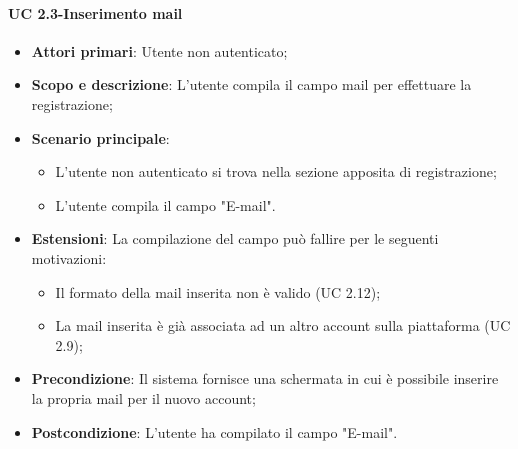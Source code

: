                 
                \paragraph{UC 2.3-Inserimento mail}
                \begin{itemize}
                \item \textbf{Attori primari}: Utente non autenticato;
                
                \item \textbf{Scopo e descrizione}: L'utente compila il campo mail per effettuare la registrazione; 
                \item \textbf{Scenario principale}: 
                    \begin{itemize}
                        \item L'utente non autenticato si trova nella sezione apposita di registrazione;
                        \item L'utente compila il campo "E-mail".
                    \end{itemize}
                \item \textbf{Estensioni}: La compilazione del campo può fallire per le seguenti motivazioni:
                    \begin{itemize}
                        \item Il formato della mail inserita non è valido (UC 2.12); 
                        \item La mail inserita è già associata ad un altro account sulla piattaforma (UC 2.9);
                    \end{itemize}
                \item \textbf{Precondizione}: Il sistema fornisce una schermata in cui è possibile inserire la propria               mail per il nuovo account;
                \item \textbf{Postcondizione}: L'utente ha compilato il campo "E-mail".
                \end{itemize}
                
                
                
                
                

